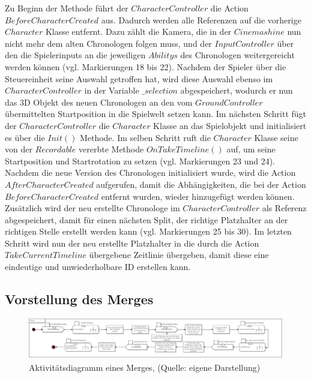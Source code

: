 Zu Beginn der Methode führt der $CharacterController$ die Action \\ $BeforeCharacterCreated$ aus. Dadurch werden alle Referenzen auf die vorherige $Character$ Klasse entfernt. Dazu zählt die Kamera, die in der $Cinemashine$ nun nicht mehr dem alten Chronologen folgen muss, und der $InputController$ über den die Spielerinputs an die jeweiligen $Abilitys$ des Chronologen weitergereicht werden können (vgl. Markierungen 18 bis 22). Nachdem der Spieler über die Steuereinheit seine Auswahl getroffen hat, wird diese Auswahl ebenso im $CharacterController$ in der Variable $\_selection$ abgespeichert, wodurch er nun das \ac{3D} Objekt des neuen Chronologen an den vom $GroundController$ übermittelten Startposition in die Spielwelt setzen kann. Im nächsten Schritt fügt der $CharacterController$ die $Character$ Klasse an das Spielobjekt und initialisiert es über die $Init()$ Methode. Im selben Schritt ruft die $Character$ Klasse seine von der $Recordable$ vererbte Methode $OnTakeTimeline()$ auf, um seine Startposition und Startrotation zu setzen (vgl. Markierungen 23 und 24). Nachdem die neue Version des Chronologen initialisiert wurde, wird die Action $AfterCharacterCreated$ aufgerufen, damit die Abhängigkeiten, die bei der Action $BeforeCharacterCreated$ entfernt wurden, wieder hinzugefügt werden können. Zusätzlich wird der neu erstellte Chronologe im $CharacterController$ als Referenz abgespeichert, damit für einen nächsten Split, der richtige Platzhalter an der richtigen Stelle erstellt werden kann (vgl. Markierungen 25 bis 30). Im letzten Schritt wird nun der neu erstellte Platzhalter in die durch die Action $TakeCurrentTimeline$ übergebene Zeitlinie übergeben, damit diese eine eindeutige und unwiederholbare \ac{ID} erstellen kann.

\subsection{Vorstellung des Merges}\label{sec:merge_prototype}

\begin{figure}[ht]
\centering
\includegraphics[width=1\linewidth]{content/pictures/Merge_uml.jpg}
\caption{Aktivitätsdiagramm eines Merges, (Quelle: eigene Darstellung)}
\label{fig:merge-uml}
\end{figure}

